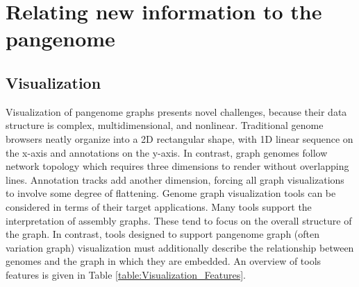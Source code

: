\section{Relating new information to the pangenome}

\subsection{Visualization}


Visualization of pangenome graphs presents novel challenges, because their data structure is complex, multidimensional, and nonlinear.
Traditional genome browsers neatly organize into a 2D rectangular shape, with 1D linear sequence on the x-axis and annotations on the y-axis.
In contrast, graph genomes follow network topology which requires three dimensions to render without overlapping lines.
Annotation tracks add another dimension, forcing all graph visualizations to involve some degree of flattening.  
Genome graph visualization tools can be considered in terms of their target applications. 
Many tools support the interpretation of assembly graphs. 
These tend to focus on the overall structure of the graph. 
In contrast, tools designed to support pangenome graph (often variation graph) visualization must additionally describe the relationship between genomes and the graph in which they are embedded.
An overview of tools features is given in Table \ref{table:Visualization_Features}.

